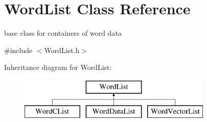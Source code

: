 \hypertarget{classWordList}{\section{Word\-List Class Reference}
\label{classWordList}
}


base class for containers of word data  




{\ttfamily \#include $<$Word\-List.\-h$>$}

Inheritance diagram for Word\-List\-:\begin{figure}[H]
\begin{center}
\leavevmode
\includegraphics[height=2.000000cm]{classWordList}
\end{center}
\end{figure}
